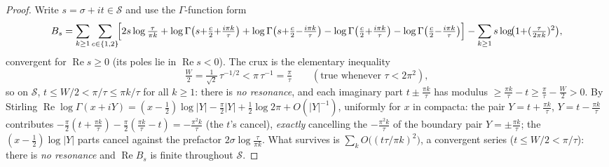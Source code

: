 \begin{proof}
Write $s=\sigma+it\in\mathcal S$ and use the $\Gamma$-function form
\[
  B_s=\sum_{k\ge1}\sum_{c\in\{1,2\}}\!\Bigl[2s\log\tfrac{\tau}{\pi k}
  +\log\Gamma\bigl(s{+}\tfrac c2{+}\tfrac{i\pi k}{\tau}\bigr)
  +\log\Gamma\bigl(s{+}\tfrac c2{-}\tfrac{i\pi k}{\tau}\bigr)
  -\log\Gamma\bigl(\tfrac c2{+}\tfrac{i\pi k}{\tau}\bigr)
  -\log\Gamma\bigl(\tfrac c2{-}\tfrac{i\pi k}{\tau}\bigr)\Bigr]
  -\sum_{k\ge1}s\log\!\bigl(1{+}(\tfrac{\tau}{2\pi k})^2\bigr),
\]
convergent for $\operatorname{Re}s\ge0$ (its poles lie in $\operatorname{Re}s<0$). The crux is the
elementary inequality
\[
  \tfrac W2=\tfrac1{\sqrt2}\,\tau^{-1/2}<\pi\,\tau^{-1}=\tfrac\pi\tau
  \qquad(\text{true whenever }\tau<2\pi^2),
\]
so on $\mathcal S$, $t\le W/2<\pi/\tau\le\pi k/\tau$ for all $k\ge1$: there is \emph{no resonance}, and
each imaginary part $t\pm\tfrac{\pi k}\tau$ has modulus $\ge\tfrac{\pi k}\tau-t\ge\tfrac\pi\tau-\tfrac W2>0$.
By Stirling $\operatorname{Re}\log\Gamma(x{+}iY)=(x{-}\tfrac12)\log|Y|-\tfrac\pi2|Y|+\tfrac12\log2\pi+O(|Y|^{-1})$,
uniformly for $x$ in compacta: the pair $Y=t{+}\tfrac{\pi k}\tau$, $Y=t{-}\tfrac{\pi k}\tau$ contributes
$-\tfrac\pi2(t{+}\tfrac{\pi k}\tau)-\tfrac\pi2(\tfrac{\pi k}\tau{-}t)=-\tfrac{\pi^2k}\tau$ (the $t$'s cancel),
\emph{exactly} cancelling the $-\tfrac{\pi^2k}\tau$ of the boundary pair $Y=\pm\tfrac{\pi k}\tau$; the
$(x{-}\tfrac12)\log|Y|$ parts cancel against the prefactor $2\sigma\log\tfrac\tau{\pi k}$. What survives is
$\sum_k O\!\bigl((t\tau/\pi k)^2\bigr)$, a convergent series ($t\le W/2<\pi/\tau$): there is \emph{no
resonance} and $\operatorname{Re}B_s$ is finite throughout $\mathcal S$.


\end{proof}
